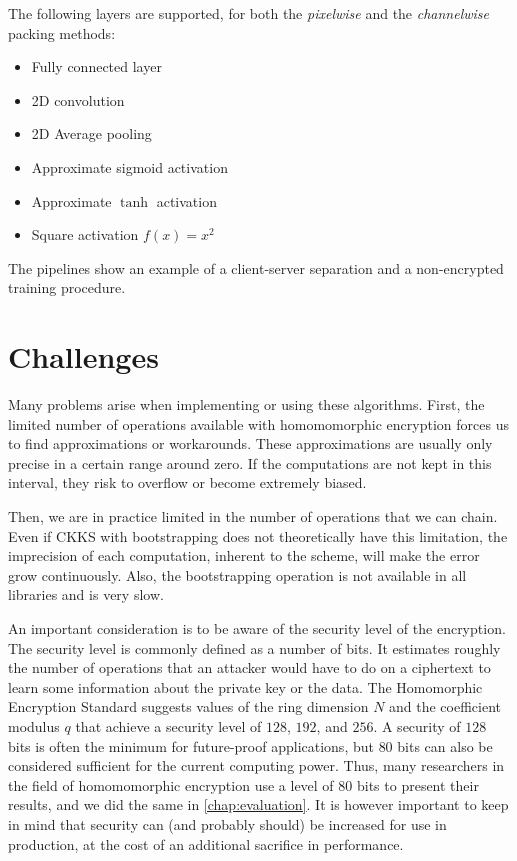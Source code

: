 \documentclass[a4paper,11pt,oneside]{report}
\begin{document}
The following layers are supported, for both the \emph{pixelwise} and the \emph{channelwise} packing methods:
\begin{itemize}
  \item Fully connected layer
  \item 2D convolution
  \item 2D Average pooling
  \item Approximate sigmoid activation
  \item Approximate $\tanh$ activation
  \item Square activation $f(x) = x^2$
\end{itemize}

The pipelines show an example of a client-server separation and a non-encrypted training procedure.


\section{Challenges}

Many problems arise when implementing or using these algorithms. 
First, the limited number of operations available with homomomorphic encryption forces us to find approximations or workarounds. 
These approximations are usually only precise in a certain range around zero. If the computations are not kept in this interval, they risk to overflow or become extremely biased.

Then, we are in practice limited in the number of operations that we can chain. 
Even if CKKS with bootstrapping does not theoretically have this limitation, the imprecision of each computation, inherent to the scheme, will make the error grow continuously.
Also, the bootstrapping operation is not available in all libraries and is very slow.

An important consideration is to be aware of the security level of the encryption. 
The security level is commonly defined as a number of bits. 
It estimates roughly the number of operations that an attacker would have to do on a ciphertext to learn some information about the private key or the data.
The Homomorphic Encryption Standard \cite{albrecht_homomorphic_2021} suggests values of the ring dimension $N$ and the coefficient modulus $q$ that achieve a security level of $128$, $192$, and $256$. 
A security of $128$ bits is often the minimum for future-proof applications, but $80$ bits can also be considered sufficient for the current computing power.
Thus, many researchers in the field of homomomorphic encryption use a level of $80$ bits to present their results, and we did the same in \autoref{chap:evaluation}.
It is however important to keep in mind that security can (and probably should) be increased for use in production, at the cost of an additional sacrifice in performance.
\end{document}
